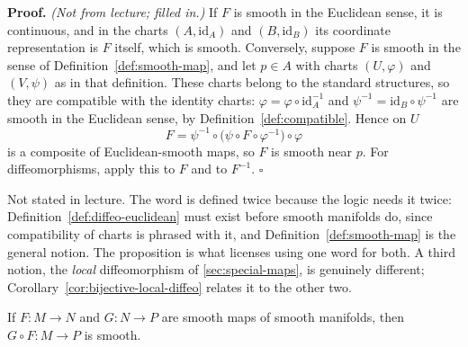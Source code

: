 \documentclass[11pt]{report}
\makeatletter
\newcounter{thmcounter}[section]
\renewenvironment{proof}[1][Proof]{\noindent\textbf{#1.} }{\hfill$\square$\par\vspace{5pt}}
\newcommand{\thmlabel}[1]{\edef\@currentlabel{\arabic{section}.\arabic{thmcounter}}\label{#1}}
\newcommand{\leeref}[1]{\par\smallskip{\raggedleft\footnotesize\textsc{Lee}:\ #1\par}}
\makeatother
\begin{document}
\begin{proof}
\textit{(Not from lecture; filled in.)} If $F$ is smooth in the Euclidean sense, it is continuous, and in the charts $(A, \mathrm{id}_A)$ and $(B, \mathrm{id}_B)$ its coordinate representation is $F$ itself, which is smooth. Conversely, suppose $F$ is smooth in the sense of Definition~\ref{def:smooth-map}, and let $p \in A$ with charts $(U, \varphi)$ and $(V, \psi)$ as in that definition. These charts belong to the standard structures, so they are compatible with the identity charts: $\varphi = \varphi \circ \mathrm{id}_A^{-1}$ and $\psi^{-1} = \mathrm{id}_B \circ \psi^{-1}$ are smooth in the Euclidean sense, by Definition~\ref{def:compatible}. Hence on $U$
\[
F = \psi^{-1} \circ \big(\psi \circ F \circ \varphi^{-1}\big) \circ \varphi
\]
is a composite of Euclidean-smooth maps, so $F$ is smooth near $p$. For diffeomorphisms, apply this to $F$ and to $F^{-1}$.
\end{proof}

\begin{rembox}\label{rem:smooth-structures-9}
Not stated in lecture. The word is defined twice because the logic needs it twice: Definition~\ref{def:diffeo-euclidean} must exist before smooth manifolds do, since compatibility of charts is phrased with it, and Definition~\ref{def:smooth-map} is the general notion. The proposition is what licenses using one word for both. A third notion, the \emph{local} diffeomorphism of \ref{sec:special-maps}, is genuinely different; Corollary~\ref{cor:bijective-local-diffeo} relates it to the other two.
\end{rembox}

\begin{lembox}\thmlabel{lem:composition-smooth}
If $F : M \to N$ and $G : N \to P$ are smooth maps of smooth manifolds, then $G \circ F : M \to P$ is smooth.
\leeref{Proposition 2.10}
\end{lembox}
\end{document}
